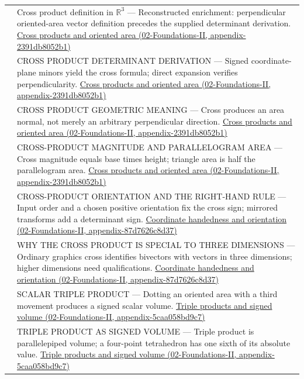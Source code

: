 {\begin{longtable}[]{@{}
  >{\raggedright\arraybackslash}p{}
  >{\raggedright\arraybackslash}p{}@{}}
542 & Cross product definition in \(\mathbb R^3\) --- Reconstructed enrichment: perpendicular oriented-area vector definition precedes the supplied determinant derivation. \href{../02-Foundations-II/main.pdf\#nameddest=appendix-2391db8052b1}{Cross products and oriented area (02-Foundations-II, appendix-2391db8052b1)} \\
543 & CROSS PRODUCT DETERMINANT DERIVATION --- Signed coordinate-plane minors yield the cross formula; direct expansion verifies perpendicularity. \href{../02-Foundations-II/main.pdf\#nameddest=appendix-2391db8052b1}{Cross products and oriented area (02-Foundations-II, appendix-2391db8052b1)} \\
544 & CROSS PRODUCT GEOMETRIC MEANING --- Cross produces an area normal, not merely an arbitrary perpendicular direction. \href{../02-Foundations-II/main.pdf\#nameddest=appendix-2391db8052b1}{Cross products and oriented area (02-Foundations-II, appendix-2391db8052b1)} \\
545 & CROSS-PRODUCT MAGNITUDE AND PARALLELOGRAM AREA --- Cross magnitude equals base times height; triangle area is half the parallelogram area. \href{../02-Foundations-II/main.pdf\#nameddest=appendix-2391db8052b1}{Cross products and oriented area (02-Foundations-II, appendix-2391db8052b1)} \\
546 & CROSS-PRODUCT ORIENTATION AND THE RIGHT-HAND RULE --- Input order and a chosen positive orientation fix the cross sign; mirrored transforms add a determinant sign. \href{../02-Foundations-II/main.pdf\#nameddest=appendix-87d7626c8d37}{Coordinate handedness and orientation (02-Foundations-II, appendix-87d7626c8d37)} \\
547 & WHY THE CROSS PRODUCT IS SPECIAL TO THREE DIMENSIONS --- Ordinary graphics cross identifies bivectors with vectors in three dimensions; higher dimensions need qualifications. \href{../02-Foundations-II/main.pdf\#nameddest=appendix-87d7626c8d37}{Coordinate handedness and orientation (02-Foundations-II, appendix-87d7626c8d37)} \\
548 & SCALAR TRIPLE PRODUCT --- Dotting an oriented area with a third movement produces a signed scalar volume. \href{../02-Foundations-II/main.pdf\#nameddest=appendix-5caa058bd9c7}{Triple products and signed volume (02-Foundations-II, appendix-5caa058bd9c7)} \\
549 & TRIPLE PRODUCT AS SIGNED VOLUME --- Triple product is parallelepiped volume; a four-point tetrahedron has one sixth of its absolute value. \href{../02-Foundations-II/main.pdf\#nameddest=appendix-5caa058bd9c7}{Triple products and signed volume (02-Foundations-II, appendix-5caa058bd9c7)} \\

\end{longtable}}

